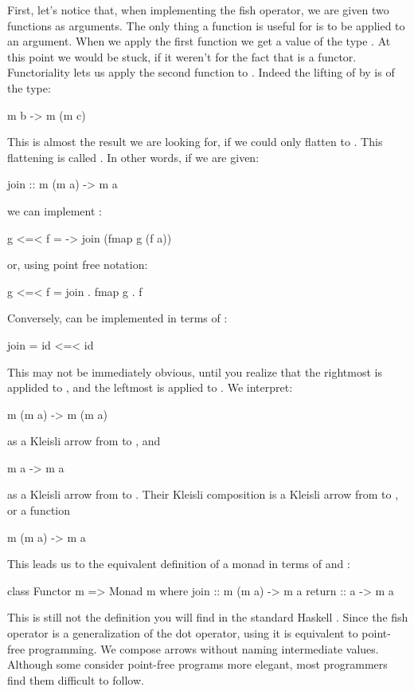 \documentclass[DaoFP]{subfiles}
\begin{document}
First, let's notice that, when implementing the fish operator, we are given two functions as arguments. The only thing a function is useful for is to be applied to an argument. When we apply the first function  we get a value of the type . At this point we would be stuck, if it weren't for the fact that  is a functor. Functoriality lets us apply the second function  to . Indeed the lifting of  by  is of the type:
\begin{haskell}
m b -> m (m c)
\end{haskell}
This is almost the result we are looking for, if we could only flatten  to . This flattening is called . In other words, if we are given:
\begin{haskell}
join ::  m (m a) -> m a
\end{haskell}
we can implement \hask{<=<}:
\begin{haskell}
g <=< f = \a -> join (fmap g (f a))
\end{haskell}
or, using point free notation:
\begin{haskell}
g <=< f = join . fmap g . f
\end{haskell}
Conversely,  can be implemented in terms of \hask{<=<}:
\begin{haskell}
join = id <=< id
\end{haskell}
This may not be immediately obvious, until you realize that the rightmost  is applided to , and the leftmost is applied to . We interpret:
\begin{haskell}
m (m a) -> m (m a)
\end{haskell}
as a Kleisli arrow from  to , and 
\begin{haskell}
m a -> m a
\end{haskell}
as a Kleisli arrow from  to . Their Kleisli composition is a Kleisli arrow from  to , or a function 
\begin{haskell}
m (m a) -> m a
\end{haskell}

This leads us to the equivalent definition of a monad in terms of  and :
\begin{haskell}
class Functor m => Monad m where
  join :: m (m a) -> m a
  return :: a -> m a
\end{haskell}

This is still not the definition you will find in the standard Haskell . Since the fish operator is a generalization of the dot operator, using it is equivalent to point-free programming. We compose arrows without naming intermediate values. Although some consider point-free programs more elegant, most programmers find them difficult to follow. 
\end{document}
